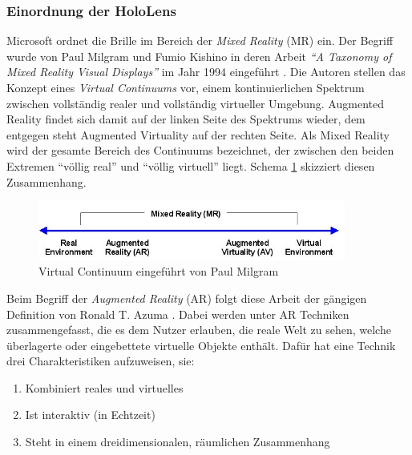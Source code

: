\subsubsection{Einordnung der HoloLens}
\label{sec-2-1-1}
Microsoft ordnet die Brille im Bereich der \textit{Mixed Reality} (MR) ein. Der Begriff  wurde von Paul Milgram und Fumio Kishino in deren Arbeit \textit{``A Taxonomy of Mixed Reality Visual Displays''} im Jahr 1994 eingeführt \cite{Milgram94}. Die Autoren stellen das Konzept eines \textit{Virtual Continuums} vor, einem kontinuierlichen Spektrum zwischen vollständig realer und vollständig virtueller Umgebung. Augmented Reality findet sich damit auf der linken Seite des Spektrums wieder, dem entgegen steht Augmented Virtuality auf der rechten Seite. Als Mixed Reality wird der gesamte Bereich des Continuums bezeichnet, der zwischen den beiden Extremen ``völlig real'' und ``völlig virtuell'' liegt. Schema \ref{img:virtual_continuum} skizziert diesen Zusammenhang.\\

\begin{figure}[h!]
	\centering
	\includegraphics[width=0.9\textwidth]{images/papers/virtual_continuum.png}
	\caption{Virtual Continuum eingeführt von Paul Milgram \cite{Milgram94}}
	\label{img:virtual_continuum}
\end{figure}

Beim Begriff der \textit{Augmented Reality} (AR) folgt diese Arbeit der gängigen Definition von Ronald T. Azuma \cite{Azuma97}. Dabei werden unter AR Techniken zusammengefasst, die es dem Nutzer erlauben, die reale Welt zu sehen, welche überlagerte oder eingebettete virtuelle Objekte enthält. Dafür hat eine Technik drei Charakteristiken aufzuweisen, sie:
\begin{enumerate}
	\setlength{\itemsep}{-5pt}
	\item Kombiniert reales und virtuelles
	\item Ist interaktiv (in Echtzeit)
	\item Steht in einem dreidimensionalen, räumlichen Zusammenhang
\end{enumerate}

